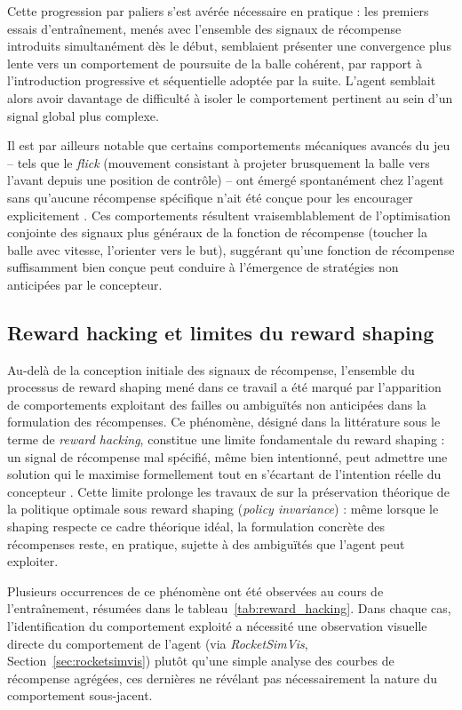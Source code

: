 Cette progression par paliers s'est avérée nécessaire en pratique : les premiers essais d'entraînement, menés avec l'ensemble des signaux de récompense introduits simultanément dès le début, semblaient présenter une convergence plus lente vers un comportement de poursuite de la balle cohérent, par rapport à l'introduction progressive et séquentielle adoptée par la suite. L'agent semblait alors avoir davantage de difficulté à isoler le comportement pertinent au sein d'un signal global plus complexe.

Il est par ailleurs notable que certains comportements mécaniques avancés du jeu -- tels que le \textit{flick} (mouvement consistant à projeter brusquement la balle vers l'avant depuis une position de contrôle) -- ont émergé spontanément chez l'agent sans qu'aucune récompense spécifique n'ait été conçue pour les encourager explicitement \parencite{davidplnmrRLAgentLearnt2026}. Ces comportements résultent vraisemblablement de l'optimisation conjointe des signaux plus généraux de la fonction de récompense (toucher la balle avec vitesse, l'orienter vers le but), suggérant qu'une fonction de récompense suffisamment bien conçue peut conduire à l'émergence de stratégies non anticipées par le concepteur.

\subsection{Reward hacking et limites du reward shaping}
\label{sec:reward_hacking}

Au-delà de la conception initiale des signaux de récompense, l'ensemble du processus de reward shaping mené dans ce travail a été marqué par l'apparition de comportements exploitant des failles ou ambiguïtés non anticipées dans la formulation des récompenses. Ce phénomène, désigné dans la littérature sous le terme de \textit{reward hacking}, constitue une limite fondamentale du reward shaping : un signal de récompense mal spécifié, même bien intentionné, peut admettre une solution qui le maximise formellement tout en s'écartant de l'intention réelle du concepteur \parencite{amodeiConcreteProblemsAI2016}. Cette limite prolonge les travaux de \textcite{645528.657613} sur la préservation théorique de la politique optimale sous reward shaping (\textit{policy invariance}) : même lorsque le shaping respecte ce cadre théorique idéal, la formulation concrète des récompenses reste, en pratique, sujette à des ambiguïtés que l'agent peut exploiter.

Plusieurs occurrences de ce phénomène ont été observées au cours de l'entraînement, résumées dans le tableau~\ref{tab:reward_hacking}. Dans chaque cas, l'identification du comportement exploité a nécessité une observation visuelle directe du comportement de l'agent (via \textit{RocketSimVis}, Section~\ref{sec:rocketsimvis}) plutôt qu'une simple analyse des courbes de récompense agrégées, ces dernières ne révélant pas nécessairement la nature du comportement sous-jacent.

